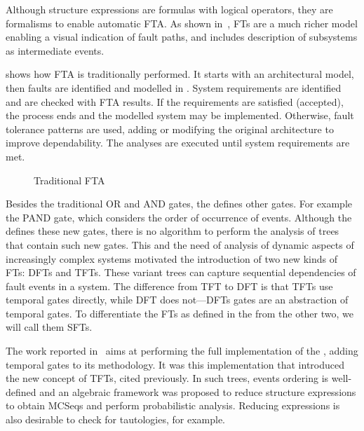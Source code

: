 Although structure expressions are formulas with logical operators, they are formalisms to enable automatic \ac{FTA}.
As shown in~\cite{Ericson2005}, \acp{FT} are a much richer model enabling a visual indication of fault paths, and includes description of subsystems as intermediate events.

 shows how \ac{FTA} is traditionally performed.
It starts with an architectural model, then faults are identified and modelled in .
System requirements are identified and are checked with \ac{FTA} results.
If the requirements are satisfied (accepted), the process ends and the modelled system may be implemented.
Otherwise, fault tolerance patterns are used, adding or modifying the original architecture to improve dependability.
The analyses are executed until system requirements are met.

\begin{figure}[htb]
  \centering
  \caption{Traditional \ac{FTA}}
  \label{fig:strategy-overview-traditional}
\end{figure}

Besides the traditional \ac{OR} and \ac{AND} gates, the \FThandbook defines other gates.
For example the \ac{PAND} gate, which considers the order of occurrence of events.
Although the \FThandbook defines these new gates, there is no algorithm to perform the analysis of trees that contain such new gates.
This and the need of analysis of dynamic aspects of increasingly complex systems motivated the introduction of two new kinds of \aclp{FT}: \acp{DFT} and \acp{TFT}.
These variant trees can capture sequential dependencies of fault events in a system.
The difference from \ac{TFT} to \ac{DFT} is that \acp{TFT} use temporal gates directly, while \ac{DFT} does not---\acp{DFT} gates are an abstraction of temporal gates.
To differentiate the \aclp{FT} as defined in the \FThandbook from the other two, we will call them \acp{SFT}.

The work reported in~\cite{WP2009} aims at performing the full implementation of the \FThandbook, adding temporal gates to its \pandora methodology.
It was this implementation that introduced the new concept of \acp{TFT}, cited previously.
In such trees, events ordering is well-defined and an algebraic framework was proposed to reduce structure expressions to obtain \acp{MCSeq} and perform probabilistic analysis.
Reducing expressions is also desirable to check for tautologies, for example.

